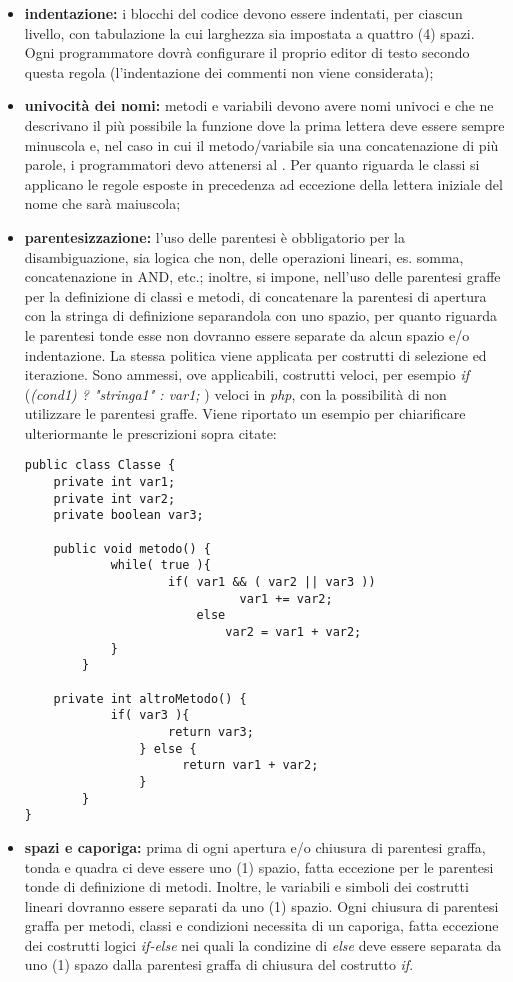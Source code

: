 					\begin{itemize}
						\item \textbf{indentazione:} i blocchi del codice devono essere indentati, per ciascun livello, con tabulazione la cui larghezza sia impostata a quattro (4) spazi. Ogni programmatore dovrà configurare il proprio editor di testo secondo questa regola (l'indentazione dei commenti non viene considerata);
						\item \textbf{univocità dei nomi:} metodi e variabili devono avere nomi univoci e che ne descrivano il più possibile la funzione dove la prima lettera deve essere sempre minuscola e, nel caso in cui il metodo/variabile sia una concatenazione di più parole, i programmatori devo attenersi al .
						Per quanto riguarda le classi si applicano le regole esposte in precedenza ad eccezione della lettera iniziale del nome che sarà maiuscola;
						\item \textbf{parentesizzazione:} l'uso delle parentesi è obbligatorio per la disambiguazione, sia logica che non, delle operazioni lineari, es. somma, concatenazione in AND, etc.; inoltre, si impone, nell'uso delle parentesi graffe per la definizione di classi e metodi, di concatenare la parentesi di apertura con la stringa di definizione separandola con uno spazio, per quanto riguarda le parentesi tonde esse non dovranno essere separate da alcun spazio e/o indentazione. La stessa politica viene applicata per costrutti di selezione ed iterazione. Sono ammessi, ove applicabili, costrutti veloci, per esempio  \textit{if} (\textit{(cond1) ? "stringa1" : var1; }) veloci in \textit{php}, con la possibilità di non utilizzare le parentesi graffe. Viene riportato un esempio per chiarificare ulteriormante le prescrizioni sopra citate:
						\lstset{language=Java}
						\begin{lstlisting}
public class Classe {
	private int var1;
	private int var2;
	private boolean var3;
	
	public void metodo() {
		    while( true ){
				    if( var1 && ( var2 || var3 ))
							  var1 += var2;
						else
						    var2 = var1 + var2;
			}
		}
	
	private int altroMetodo() {
		    if( var3 ){
				  	return var3;
				} else {
					  return var1 + var2;
				}
		}
}
						\end{lstlisting}
						\item \textbf{spazi e caporiga:} prima di ogni apertura e/o chiusura di parentesi graffa, tonda e quadra ci deve essere uno (1) spazio, fatta eccezione per le parentesi tonde di definizione di metodi. Inoltre, le variabili e simboli dei costrutti lineari dovranno essere separati da uno (1) spazio. Ogni chiusura di parentesi graffa per metodi, classi e condizioni necessita di un caporiga, fatta eccezione dei costrutti logici \textit{if-else} nei quali la condizine di \textit{else} deve essere separata da uno (1) spazo dalla parentesi graffa di chiusura del costrutto \textit{if}.
					\end{itemize}



